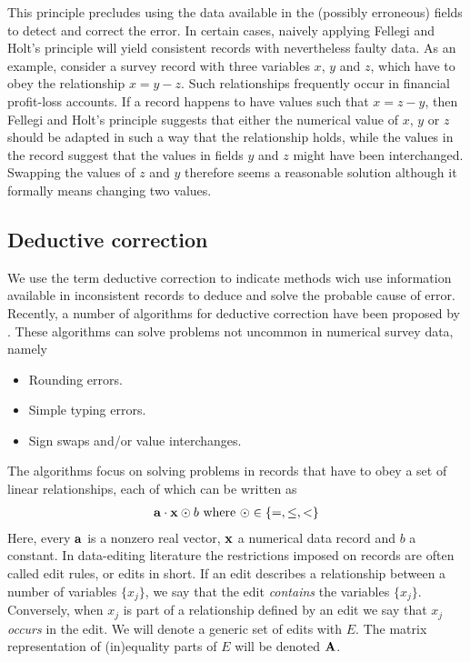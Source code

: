 \documentclass[11pt, fleqn, a4paper]{article}
\begin{document}
This principle precludes using the data available in the (possibly erroneous)
fields to detect and correct the error. In certain cases, naively applying
Fellegi and Holt's principle will yield consistent records with nevertheless
faulty data. As an example, consider a survey record with three variables $x$,
$y$ and $z$, which have to obey the relationship $x=y-z$. Such relationships
frequently occur in financial profit-loss accounts. If a record happens to have
values such that $x=z-y$, then Fellegi and Holt's principle suggests that
either the numerical value of $x$, $y$ or $z$ should be adapted in such a way
that the relationship holds, while the values in the record suggest that the
values in fields $y$ and $z$ might have been interchanged. Swapping the values
of $z$ and $y$ therefore seems a reasonable solution although it formally means
changing two values.

\subsection{Deductive correction}
We use the term deductive correction to indicate methods wich use information
available in inconsistent records to deduce and solve the probable cause of
error. Recently, a number of algorithms for deductive correction have
been proposed by \cite{scholtus:2008, scholtus:2009}. These algorithms
can solve problems not uncommon in numerical survey data, namely
%
\begin{itemize}
\item Rounding errors.
\item Simple typing errors.
\item Sign swaps and/or value interchanges.
\end{itemize}
%
The algorithms focus on solving problems in records that have to
obey a set of linear relationships, each of which can be written as
%
\begin{eqnarray}
{\bf a}\cdot{\bf x} \odot b \textrm{ where } \odot \in\{=,\leq,<\}
\label{edit}
\end{eqnarray}
%
Here, every $\bf a$ is a nonzero real vector, $\bf x$ a numerical data record and $b$ 
a constant. In data-editing literature the restrictions imposed on records are
often called edit rules, or edits in short. If an edit describes a relationship
between a number of variables $\{x_j\}$, we say that the edit {\em contains}
the variables $\{x_j\}$. Conversely, when $x_j$ is part of a relationship
defined by an edit we say that $x_j$ {\em occurs} in the edit. We will denote
a generic set of edits with $E$. The matrix representation of (in)equality parts
of $E$ will be denoted $\bf{A}$.
\end{document}
